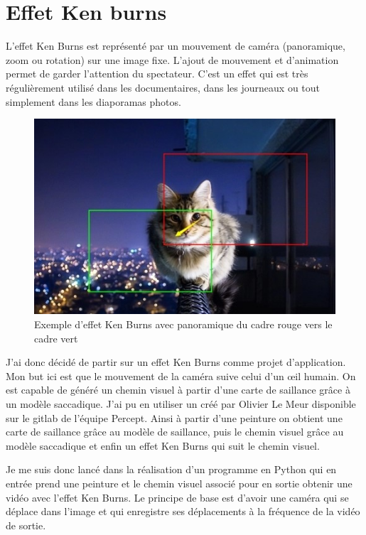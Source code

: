 \newpage
\section{Effet Ken burns}

\par
L'effet Ken Burns est représenté par un mouvement de caméra (panoramique, zoom ou rotation) sur une image fixe. L'ajout de mouvement et d'animation permet de garder l'attention du spectateur. C'est un effet qui est très régulièrement utilisé dans les documentaires, dans les journeaux ou tout simplement dans les diaporamas photos. 

\begin{figure}[ht]
    \centering
    \includegraphics[width=0.7\linewidth]{datas/kenburnseffect.jpg}
    \caption{Exemple d'effet Ken Burns avec panoramique du cadre rouge vers le cadre vert}
    \label{kenburnsexemple}
\end{figure}

\par
J'ai donc décidé de partir sur un effet Ken Burns comme projet d'application. Mon but ici est que le mouvement de la caméra suive celui d'un \oe{}il humain. On est capable de généré un chemin visuel à partir d'une carte de saillance grâce à un modèle saccadique. J'ai pu en utiliser un créé par Olivier Le Meur \cite{saccadicmodel} disponible sur le gitlab de l'équipe Percept. Ainsi à partir d'une peinture on obtient une carte de saillance grâce au modèle de saillance, puis le chemin visuel grâce au modèle saccadique et enfin un effet Ken Burns qui suit le chemin visuel.

\par
Je me suis donc lancé dans la réalisation d'un programme en Python qui en entrée prend une peinture et le chemin visuel associé pour en sortie obtenir une vidéo avec l'effet Ken Burns. Le principe de base est d'avoir une caméra qui se déplace dans l'image et qui enregistre ses déplacements à la fréquence de la vidéo de sortie.


